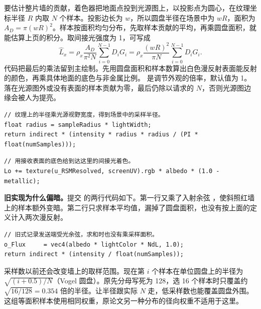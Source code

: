 要估计整片墙的贡献，着色器把地面点投到光源图上，以投影点为圆心，在纹理坐标半径 $R$ 内取 $N$ 个样本。投影边长为 $w$，所以圆盘半径在场景中为 $wR$，面积为 $A_D=\pi(wR)^2$。样本按面积均匀分布，先取样本贡献的平均，再乘圆盘面积，就能估算上页的积分。取间接光强度为 1，可写成
\[
 \widehat L_x=\rho_x\frac{A_D}{\pi^2 N}\sum_{i=0}^{N-1}D_i G_i
              =\rho_x\frac{(wR)^2}{\pi N}\sum_{i=0}^{N-1}D_i G_i .
\]
代码把最后的乘法留到主绘制。先用圆盘面积和样本数算出白色漫反射表面能反射的颜色，再乘具体地面的底色与非金属比例。 是调节外观的倍率，默认值为 1。落在光源图外或没有表面的样本贡献为零，最后仍除以请求的 $N$，否则光源图边缘会被人为提亮。
\begin{lstlisting}
// 纹理上的半径乘光源视野宽度，得到场景中的采样半径。
float radius = sampleRadius * lightWidth;
return indirect * (intensity * radius * radius / (PI * float(numSamples)));
\end{lstlisting}
\begin{lstlisting}
// 用接收表面的底色给到达这里的间接光着色。
Lo += texture(u_RSMResolved, screenUV).rgb * albedo * (1.0 - metallic);
\end{lstlisting}

\textbf{旧实现为什么偏暗。}提交  的两行代码如下。第一行又乘了入射余弦 ，使斜照红墙上的样本额外变暗。第二行只求样本平均值，漏掉了圆盘面积，也没有按上面的定义计入两次漫反射。
\begin{lstlisting}[title={旧版 RSMDepth 与 RSMIndirect 中的表达式}]
// 旧式记录发送端受光余弦，求和时也没有乘采样面积。
o_Flux     = vec4(albedo * lightColor * NdL, 1.0);
return indirect * (intensity / float(numSamples));
\end{lstlisting}

采样数以前还会改变墙上的取样范围。现在第 $i$ 个样本在单位圆盘上的半径为 $\sqrt{(i+0.5)/N}$（Vogel 圆盘）。原先分母写死为 128，选 16 个样本时只覆盖约 $\sqrt{16/128}=0.354$ 倍的半径。让半径跟实际 $N$ 走，低采样数也能覆盖圆盘外围。这组等面积样本使用相同权重，原论文另一种分布的径向权重不适用于这里。

\newpage

